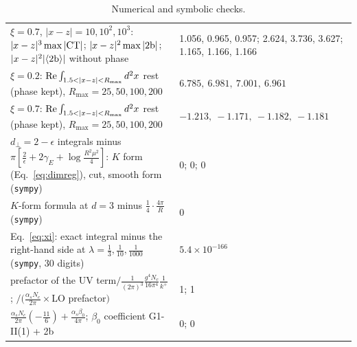 \documentclass[10pt]{article}
\numberwithin{equation}{section}
\begin{document}
\begin{table}[H]
\begin{tabular}{@{}p{} p{}@{}}
$\xi=0.7$, $|x-z|=10,10^2,10^3$: $|x-z|^3\max|{\rm CT}|$; $|x-z|^2\max|{\rm 2b}|$; $|x-z|^2|\langle{\rm 2b}\rangle|$ without phase & 1.056, 0.965, 0.957; 2.624, 3.736, 3.627; 1.165, 1.166, 1.166\\
$\xi=0.2$: ${\rm Re}\int_{1.5<|x-z|<R_{\max}}d^2x$ rest (phase kept), $R_{\max}=25,50,100,200$ & $6.785,\ 6.981,\ 7.001,\ 6.961$\\
$\xi=0.7$: ${\rm Re}\int_{1.5<|x-z|<R_{\max}}d^2x$ rest (phase kept), $R_{\max}=25,50,100,200$ & $-1.213,\ -1.171,\ -1.182,\ -1.181$\\
$d_\perp=2-\epsilon$ integrals minus $\pi[\frac2\epsilon+2\gamma_E+\log\frac{R^2\mu^2}{4}]$: $K$ form (Eq.~\eqref{eq:dimreg}), cut, smooth form (\texttt{sympy}) & 0; 0; 0\\
$K$-form formula at $d=3$ minus $\frac14\cdot\frac{4\pi}{R}$ (\texttt{sympy}) & 0\\
Eq.~\eqref{eq:xi}: exact integral minus the right-hand side at $\lambda=\frac13,\frac1{10},\frac1{1000}$ (\texttt{sympy}, 30 digits) & $5.4\times10^{-166}$\\
prefactor of the UV term$/\frac{1}{(2\pi)^3}\frac{g^4N_c}{16\pi^4}\frac{1}{k^+}$; $/\big(\frac{\alpha_sN_c}{2\pi}\times$LO prefactor$\big)$ & 1; 1\\
$\frac{\alpha_sN_c}{2\pi}(-\frac{11}{6})+\frac{\alpha_s\beta_0}{4\pi}$; $\beta_0$ coefficient G1-II(1) + 2b & 0; 0\\
\end{tabular}
\caption{Numerical and symbolic checks.}
\label{tab:checks}
\end{table}
\end{document}
